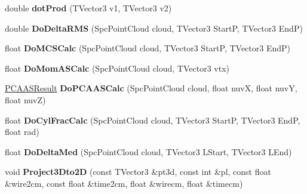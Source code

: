 \begin{DoxyCompactItemize}
\item 
double {\bfseries dot\+Prod} (T\+Vector3 v1, T\+Vector3 v2)\hypertarget{classanalysis_1_1MCS_aa291dd886fbd0e2afbddc67a51fa9c84}{}\label{classanalysis_1_1MCS_aa291dd886fbd0e2afbddc67a51fa9c84}

\item 
double {\bfseries Do\+Delta\+R\+MS} (Spc\+Point\+Cloud cloud, T\+Vector3 StartP, T\+Vector3 EndP)\hypertarget{classanalysis_1_1MCS_a97309019c6e17df5d3b041ef35bdbc46}{}\label{classanalysis_1_1MCS_a97309019c6e17df5d3b041ef35bdbc46}

\item 
float {\bfseries Do\+M\+C\+S\+Calc} (Spc\+Point\+Cloud cloud, T\+Vector3 StartP, T\+Vector3 EndP)\hypertarget{classanalysis_1_1MCS_ad6797c223d16e362347c7ca850e4a3f8}{}\label{classanalysis_1_1MCS_ad6797c223d16e362347c7ca850e4a3f8}

\item 
float {\bfseries Do\+Mom\+A\+S\+Calc} (Spc\+Point\+Cloud cloud, T\+Vector3 vtx)\hypertarget{classanalysis_1_1MCS_a7d90ff2d5838b2b1d502d205fa93ee03}{}\label{classanalysis_1_1MCS_a7d90ff2d5838b2b1d502d205fa93ee03}

\item 
\hyperlink{structPCAASResult}{P\+C\+A\+A\+S\+Result} {\bfseries Do\+P\+C\+A\+A\+S\+Calc} (Spc\+Point\+Cloud cloud, float nuvX, float nuvY, float nuvZ)\hypertarget{classanalysis_1_1MCS_af9f345dc14ba0934906fb8d866f48650}{}\label{classanalysis_1_1MCS_af9f345dc14ba0934906fb8d866f48650}

\item 
float {\bfseries Do\+Cyl\+Frac\+Calc} (Spc\+Point\+Cloud cloud, T\+Vector3 StartP, T\+Vector3 EndP, float rad)\hypertarget{classanalysis_1_1MCS_aa9d637dc79f5550f2a6030bc6d62d3fc}{}\label{classanalysis_1_1MCS_aa9d637dc79f5550f2a6030bc6d62d3fc}

\item 
float {\bfseries Do\+Delta\+Med} (Spc\+Point\+Cloud cloud, T\+Vector3 L\+Start, T\+Vector3 L\+End)\hypertarget{classanalysis_1_1MCS_aeb3726de22f3edfddde36bd8b73ee1d0}{}\label{classanalysis_1_1MCS_aeb3726de22f3edfddde36bd8b73ee1d0}

\item 
void {\bfseries Project3\+Dto2D} (const T\+Vector3 \&pt3d, const int \&pl, const float \&wire2cm, const float \&time2cm, float \&wirecm, float \&timecm)\hypertarget{classanalysis_1_1MCS_a712f1bd00757ec2415b877e6075151c2}{}\label{classanalysis_1_1MCS_a712f1bd00757ec2415b877e6075151c2}

\end{DoxyCompactItemize}
